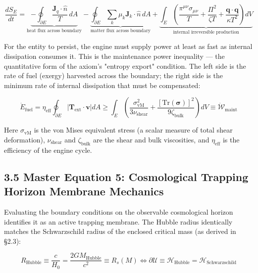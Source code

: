 \documentclass[11pt,a4paper]{article}
\theoremstyle{definition}\newtheorem{definition}{Definition}
\theoremstyle{remark}\newtheorem{remark}{Remark}
\begin{document}
\begin{equation}
\boxed{\frac{dS_E}{dt} = \underbrace{-\oint_{\partial E} \frac{\mathbf{J}_q \cdot \hat{n}}{T} \, dA}_{\text{heat flux across boundary}} - \underbrace{\oint_{\partial E} \sum_k \mu_k \mathbf{J}_k \cdot \hat{n} \, dA}_{\text{matter flux across boundary}} + \underbrace{\int_E \left( \frac{\pi^{\mu\nu}\sigma_{\mu\nu}}{T} + \frac{\Pi^2}{\zeta T} + \frac{\mathbf{q} \cdot \mathbf{q}}{\kappa T^2} \right) dV}_{\text{internal irreversible production}}}
\end{equation}


For the entity to persist, the engine must supply power at least as fast as internal dissipation consumes it. This is the maintenance power inequality — the quantitative form of the axiom's "entropy export" condition. The left side is the rate of fuel (exergy) harvested across the boundary; the right side is the minimum rate of internal dissipation that must be compensated:


\begin{equation}
\boxed{\dot{E}_{\text{fuel}} = \eta_{\text{eff}} \oint_{\partial E} \left| \mathbf{T}_{\text{ext}} \cdot \mathbf{v} \right| dA \ge \int_E \left( \frac{\sigma_{\mathrm{vM}}^2}{3\nu_{\text{shear}}} + \frac{[\mathrm{Tr}(\boldsymbol{\sigma})]^2}{9\zeta_{\text{bulk}}} \right) dV \equiv \dot{\mathcal{W}}_{\text{maint}}}
\end{equation}


Here $\sigma_{\mathrm{vM}}$ is the von Mises equivalent stress (a scalar measure of total shear deformation), $\nu_{\text{shear}}$ and $\zeta_{\text{bulk}}$ are the shear and bulk viscosities, and $\eta_{\text{eff}}$ is the efficiency of the engine cycle.
\subsection{3.5 Master Equation 5: Cosmological Trapping Horizon Membrane Mechanics}

Evaluating the boundary conditions on the observable cosmological horizon identifies it as an active trapping membrane. The Hubble radius identically matches the Schwarzschild radius of the enclosed critical mass (as derived in §2.3):


\begin{equation}
\boxed{R_{\text{Hubble}} \equiv \frac{c}{H_0} = \frac{2 G M_{\text{Hubble}}}{c^2} \equiv R_s(M) \iff \partial\mathcal{U} \equiv \mathcal{H}_{\text{Hubble}} = \mathcal{H}_{\text{Schwarzschild}}}
\end{equation}
\end{document}
